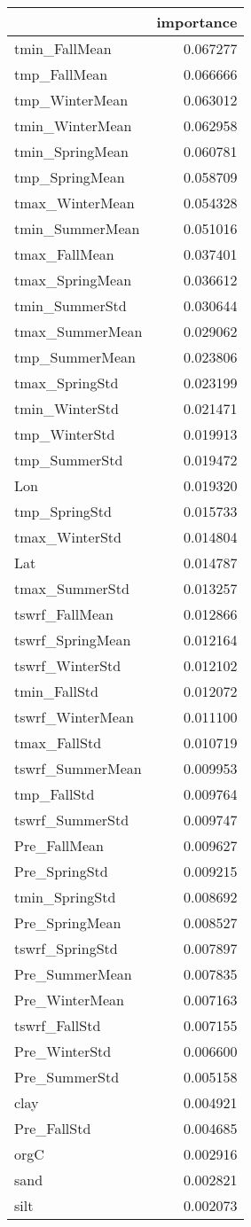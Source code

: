 \begin{tabular}{lr}
\toprule
 & importance \\
\midrule
tmin_FallMean & 0.067277 \\
tmp_FallMean & 0.066666 \\
tmp_WinterMean & 0.063012 \\
tmin_WinterMean & 0.062958 \\
tmin_SpringMean & 0.060781 \\
tmp_SpringMean & 0.058709 \\
tmax_WinterMean & 0.054328 \\
tmin_SummerMean & 0.051016 \\
tmax_FallMean & 0.037401 \\
tmax_SpringMean & 0.036612 \\
tmin_SummerStd & 0.030644 \\
tmax_SummerMean & 0.029062 \\
tmp_SummerMean & 0.023806 \\
tmax_SpringStd & 0.023199 \\
tmin_WinterStd & 0.021471 \\
tmp_WinterStd & 0.019913 \\
tmp_SummerStd & 0.019472 \\
Lon & 0.019320 \\
tmp_SpringStd & 0.015733 \\
tmax_WinterStd & 0.014804 \\
Lat & 0.014787 \\
tmax_SummerStd & 0.013257 \\
tswrf_FallMean & 0.012866 \\
tswrf_SpringMean & 0.012164 \\
tswrf_WinterStd & 0.012102 \\
tmin_FallStd & 0.012072 \\
tswrf_WinterMean & 0.011100 \\
tmax_FallStd & 0.010719 \\
tswrf_SummerMean & 0.009953 \\
tmp_FallStd & 0.009764 \\
tswrf_SummerStd & 0.009747 \\
Pre_FallMean & 0.009627 \\
Pre_SpringStd & 0.009215 \\
tmin_SpringStd & 0.008692 \\
Pre_SpringMean & 0.008527 \\
tswrf_SpringStd & 0.007897 \\
Pre_SummerMean & 0.007835 \\
Pre_WinterMean & 0.007163 \\
tswrf_FallStd & 0.007155 \\
Pre_WinterStd & 0.006600 \\
Pre_SummerStd & 0.005158 \\
clay & 0.004921 \\
Pre_FallStd & 0.004685 \\
orgC & 0.002916 \\
sand & 0.002821 \\
silt & 0.002073 \\
\bottomrule
\end{tabular}
